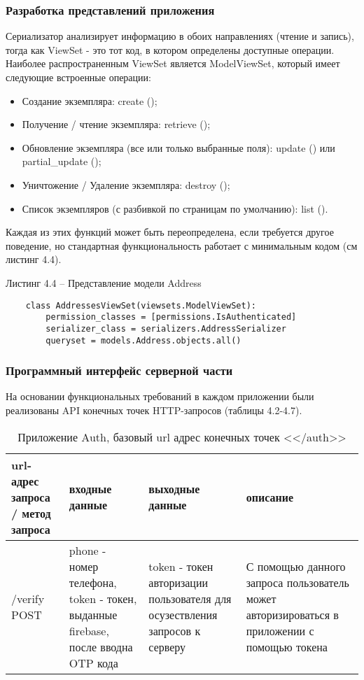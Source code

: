 \subsubsection{Разработка представлений приложения}\hfill

Сериализатор анализирует информацию в обоих направлениях (чтение и запись), тогда как ViewSet - это тот код, в котором определены доступные операции.
Наиболее распространенным ViewSet является ModelViewSet, который имеет следующие встроенные операции:
\begin{itemize}
    \item Создание экземпляра: create ();
    \item Получение / чтение экземпляра: retrieve ();
    \item Обновление экземпляра (все или только выбранные поля): update () или partial\_update ();
    \item Уничтожение / Удаление экземпляра: destroy ();
    \item Список экземпляров (с разбивкой по страницам по умолчанию): list ().
\end{itemize}

Каждая из этих функций может быть переопределена, если требуется другое поведение, но стандартная функциональность работает с минимальным кодом (см листинг 4.4).

Листинг 4.4 – Представление модели Address
\begin{lstlisting}
    class AddressesViewSet(viewsets.ModelViewSet):
        permission_classes = [permissions.IsAuthenticated]
        serializer_class = serializers.AddressSerializer
        queryset = models.Address.objects.all()
\end{lstlisting}

\subsubsection{Программный интерфейс серверной части}\hfill

На основании функциональных требований в каждом приложении были реализованы API конечных точек HTTP-запросов (таблицы 4.2-4.7).

\begin{table}
    \caption{Приложение Auth, базовый url адрес конечных точек <</auth>>}
    \begin{tabular}{ | p{3cm} | p{4cm} | p{3cm} | p{3cm} | }
        \hline
        url-адрес запроса / метод запроса & входные данные & выходные данные  & описание \\ \hline
    /verify POST  & phone - номер телефона, token - токен, выданные firebase, после вводна OTP кода & token - токен авторизации пользователя для осузествления запросов к серверу & С помощью данного запроса пользователь может авторизироваться в приложении с помощью токена \\ \hline
    \end{tabular}
\end{table}


